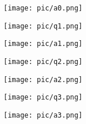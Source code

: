 \documentclass{beamer}
\begin{document}
\newcommand{\fastq}{\textit{fastq}}
\begin{frame}
\texttt{[image: pic/a0.png]} \\
\end{frame}

\begin{frame}
  \texttt{[image: pic/q1.png]} \\
\end{frame}

\begin{frame}
  \texttt{[image: pic/a1.png]} \\
\end{frame}

\begin{frame}
  \texttt{[image: pic/q2.png]} \\
\end{frame}

\begin{frame}
  \texttt{[image: pic/a2.png]} \\
\end{frame}

\begin{frame}
  \texttt{[image: pic/q3.png]} \\
\end{frame}

\begin{frame}
  \texttt{[image: pic/a3.png]} \\
\end{frame}
\end{document}
